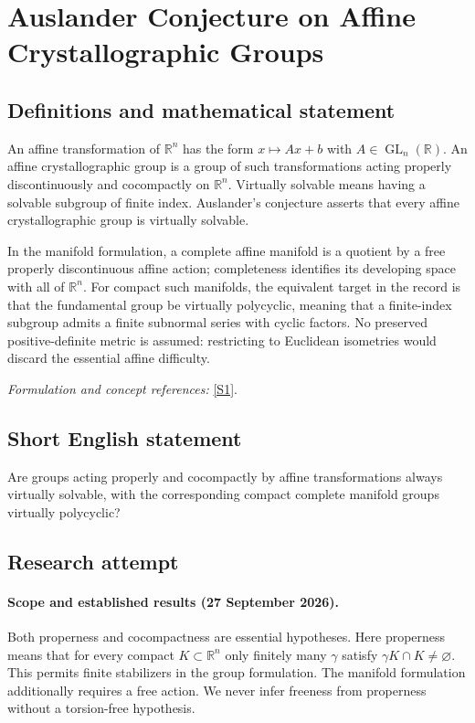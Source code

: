 \documentclass[11pt]{article}
\begin{document}
\section*{\texorpdfstring{Auslander Conjecture on Affine Crystallographic Groups}{Auslander Conjecture on Affine Crystallographic Groups}}\label{472}
\subsection{Definitions and mathematical statement}
An affine transformation of ${\mathbb{R}}^n$ has the form $x\mapsto Ax+b$ with $A\in\operatorname{GL}_n({\mathbb{R}})$. An affine crystallographic group is a group of such transformations acting properly discontinuously and cocompactly on ${\mathbb{R}}^n$. Virtually solvable means having a solvable subgroup of finite index. Auslander's conjecture asserts that every affine crystallographic group is virtually solvable.

In the manifold formulation, a complete affine manifold is a quotient by a free properly discontinuous affine action; completeness identifies its developing space with all of ${\mathbb{R}}^n$. For compact such manifolds, the equivalent target in the record is that the fundamental group be virtually polycyclic, meaning that a finite-index subgroup admits a finite subnormal series with cyclic factors. No preserved positive-definite metric is assumed: restricting to Euclidean isometries would discard the essential affine difficulty.
\par\smallskip\textit{Formulation and concept references:} \href{https://www.math.umd.edu/~wmg/gstom.pdf}{[S1]}.

\subsection{Short English statement}
Are groups acting properly and cocompactly by affine transformations always virtually solvable, with the corresponding compact complete manifold groups virtually polycyclic?
\subsection{Research attempt}

\paragraph{Scope and established results (27 September 2026).}
Both properness and cocompactness are essential hypotheses. Here
properness means that for every compact $K\subset\mathbb R^n$ only
finitely many $\gamma$ satisfy $\gamma K\cap K\ne\varnothing$.
This permits finite stabilizers in the group formulation. The manifold
formulation additionally requires a free action. We never infer
freeness from properness without a torsion-free hypothesis.
\end{document}
